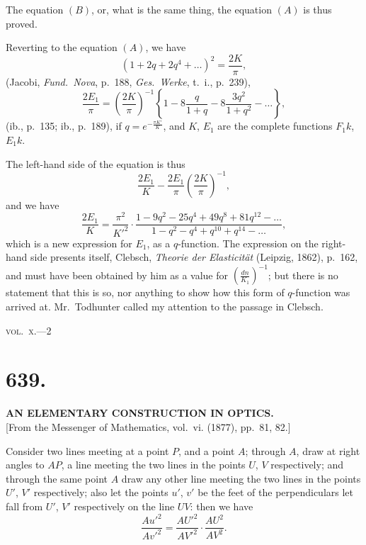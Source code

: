 \documentclass[11pt,a4paper]{book}
\begin{document}
The equation $(B)$, or, what is the same thing, the equation $(A)$ is thus proved.

Reverting to the equation $(A)$, we have
\[
(1 + 2q + 2q^4 + \ldots)^2 = \frac{2K}{\pi},
\]
(Jacobi, \textit{Fund.~Nova}, p.~188, \textit{Ges.~Werke}, t.~i., p.~239),
\[
\frac{2E_1}{\pi} = \left(\frac{2K}{\pi}\right)^{-1} \left\{1 - 8\frac{q}{1+q} - 8\frac{3q^2}{1+q^2} - \ldots\right\},
\]
(ib., p.~135; ib., p.~189),
if $q = e^{-\frac{\pi K'}{K}}$, and $K$, $E_1$ are the complete functions $F_1k$, $E_1k$.

The left-hand side of the equation is thus
\[
\frac{2E_1}{K} - \frac{2E_1}{\pi}\left(\frac{2K}{\pi}\right)^{-1},
\]
and we have
\[
\frac{2E_1}{K} = \frac{\pi^2}{K'^2} \cdot \frac{1 - 9q^2 - 25q^4 + 49q^8 + 81q^{12} - \ldots}{1 - q^2 - q^4 + q^{10} + q^{14} - \ldots},
\]
which is a new expression for $E_1$, as a $q$-function. The expression on the right-hand side presents itself, Clebsch, \textit{Theorie der Elasticit\"at} (Leipzig, 1862), p.~162, and must have been obtained by him as a value for $\left(\frac{dn}{K_1}\right)^{-1}$; but there is no statement that this is so, nor anything to show how this form of $q$-function was arrived at. Mr.~Todhunter called my attention to the passage in Clebsch.

\hfill\textsc{vol.~x.}---2

\clearpage
\setcounter{page}{28}

\section*{639.}

\begin{center}
\textbf{AN ELEMENTARY CONSTRUCTION IN OPTICS.}\\[1em]
[From the Messenger of Mathematics, vol.~vi. (1877), pp.~81, 82.]
\end{center}

Consider two lines meeting at a point $P$, and a point $A$; through $A$, draw at right angles to $AP$, a line meeting the two lines in the points $U$, $V$ respectively; and through the same point $A$ draw any other line meeting the two lines in the points $U'$, $V'$ respectively; also let the points $u'$, $v'$ be the feet of the perpendiculars let fall from $U'$, $V'$ respectively on the line $UV$: then we have
\[
\frac{Au'^2}{Av'^2} = \frac{AU'^2}{AV'^2} \cdot \frac{AU^2}{AV^2}.
\]
\end{document}
